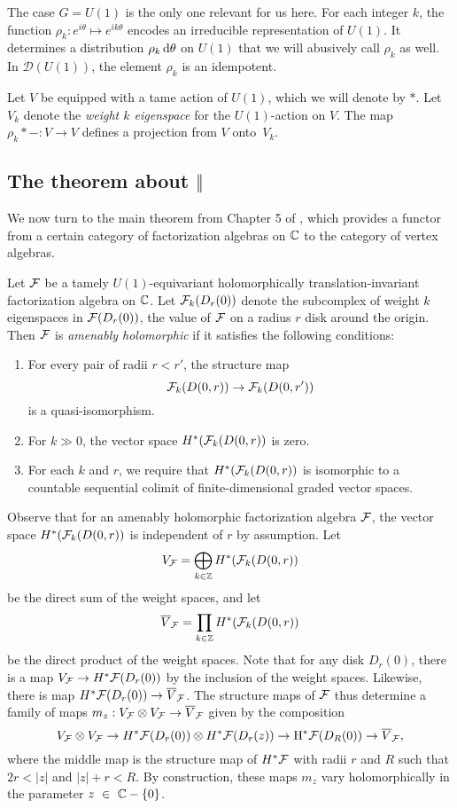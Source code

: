 The case $G = U(1)$ is the only one relevant for us here. 
For each integer $k$, the function $\rho_k: e^{i\theta} \mapsto e^{ik\theta}$ encodes an irreducible representation of $U(1)$.
It determines a distribution $\rho_k \, {\rm d} \theta$ on $U(1)$ that we will abusively call $\rho_k$ as well.
In $\mathcal{D}(U(1))$, the element $\rho_k$  is an idempotent.

\begin{dfn}
Let $V$ be equipped with a tame action of $U(1)$, which we will denote by $\ast$. 
Let $V_k$ denote the {\em weight $k$ eigenspace} for the $U(1)$-action on $V$.
The map $\rho_k \ast - : V \to V$ defines a projection from $V$ onto~$V_k$. 
\end{dfn}

\subsection{The theorem about $\Vert$}

We now turn to the main theorem from Chapter 5 of \cite{CG1}, 
which provides a functor from a certain category of factorization algebras on $\mathbb C$ to the category of vertex algebras.

\begin{dfn}
Let $\mathcal F$ be a tamely $U(1)$-equivariant holomorphically translation-invariant factorization algebra on $\mathbb C$.
Let $\mathcal F_k(D_r(0))$ denote the subcomplex of weight $k$ eigenspaces in $\mathcal F(D_r(0))$, 
the value of $\mathcal F$ on a radius $r$ disk around the origin.
Then $\mathcal F$ is {\em amenably holomorphic} if it satisfies the following conditions:
\begin{enumerate}
\item 
For every pair of radii $r < r'$, the structure map
$$
\mathcal F_k(D(0,r)) \to \mathcal F_k(D(0,r'))
$$
is a quasi-isomorphism.
\item For $k \gg 0$, the vector space $H^\ast (\mathcal F_k(D(0,r))$ is zero.  
\item For each $k$ and $r$, we require that $H^\ast(\mathcal F_k(D(0,r) )$ is isomorphic to a countable sequential colimit of finite-dimensional graded vector spaces. 
\end{enumerate}
\end{dfn}

Observe that for an amenably holomorphic factorization algebra $\mathcal F$, 
the vector space $H^* (\mathcal F_k(D(0,r))$ is independent of $r$ by assumption.
Let 
\[
V_\mathcal F= \bigoplus_{k \in \mathbb Z} H^* (\mathcal F_k(D(0,r))
\]
be the direct sum of the weight spaces, 
and let 
\[
\overline{V}_\mathcal F = \prod_{k \in \mathbb Z} H^* (\mathcal F_k(D(0,r))
\]
be the direct product of the weight spaces.
Note that for any disk $D_r(0)$, there is a map $V_\mathcal F \to H^*\mathcal F(D_r(0))$ by the inclusion of the weight spaces.
Likewise, there is map $H^*\mathcal F(D_r(0)) \to \overline{V}_\mathcal F$.
The structure maps of $\mathcal F$ thus determine a family of maps $m_z: V_\mathcal F \otimes V_\mathcal F \to \overline{V}_\mathcal F$ 
given by the composition
\[
V_\mathcal F \otimes V_\mathcal F \to H^*\mathcal F(D_r(0)) \otimes H^* \mathcal F(D_r(z)) \to {\rm H}^*\mathcal F(D_R(0)) \to \overline{V}_\mathcal F,
\]
where the middle map is the structure map of $H^* \mathcal F$ with radii $r$ and $R$ such that $2r < |z|$ and $|z| + r < R$.
By construction, these maps $m_z$ vary holomorphically in the parameter $z~\in~\mathbb C-\{0\}$.

